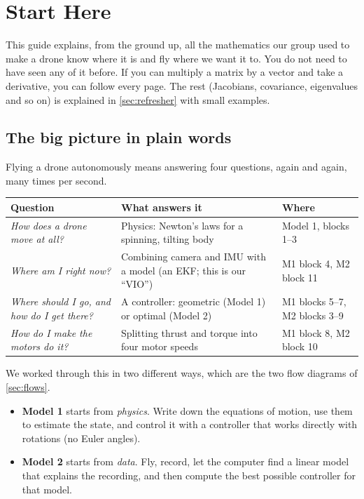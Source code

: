 \section{Start Here}
\label{sec:start}

This guide explains, from the ground up, all the mathematics our group used to make a drone know where it is
and fly where we want it to. You do not need to have seen any of it before. If you can multiply a matrix by a
vector and take a derivative, you can follow every page. The rest (Jacobians, covariance, eigenvalues and so on)
is explained in \cref{sec:refresher} with small examples.

\subsection{The big picture in plain words}

Flying a drone autonomously means answering four questions, again and again, many times per second.

\begin{center}\small
\begin{tabularx}{\linewidth}{@{}>{\raggedright\arraybackslash}p{4.1cm} X >{\raggedright\arraybackslash}p{2.8cm}@{}}
\toprule
\textbf{Question} & \textbf{What answers it} & \textbf{Where}\\
\midrule
\emph{How does a drone move at all?} & Physics: Newton's laws for a spinning, tilting body & Model 1, blocks 1--3\\
\emph{Where am I right now?} & Combining camera and IMU with a model (an EKF; this is our ``VIO'') & M1 block 4, M2 block 11\\
\emph{Where should I go, and how do I get there?} & A controller: geometric (Model 1) or optimal (Model 2) & M1 blocks 5--7, M2 blocks 3--9\\
\emph{How do I make the motors do it?} & Splitting thrust and torque into four motor speeds & M1 block 8, M2 block 10\\
\bottomrule
\end{tabularx}
\end{center}

We worked through this in two different ways, which are the two flow diagrams of \cref{sec:flows}.
\begin{itemize}
  \item \textbf{Model 1} starts from \emph{physics}. Write down the equations of motion, use them to estimate the
        state, and control it with a controller that works directly with rotations (no Euler angles).
  \item \textbf{Model 2} starts from \emph{data}. Fly, record, let the computer find a linear model that explains
        the recording, and then compute the best possible controller for that model.
\end{itemize}

